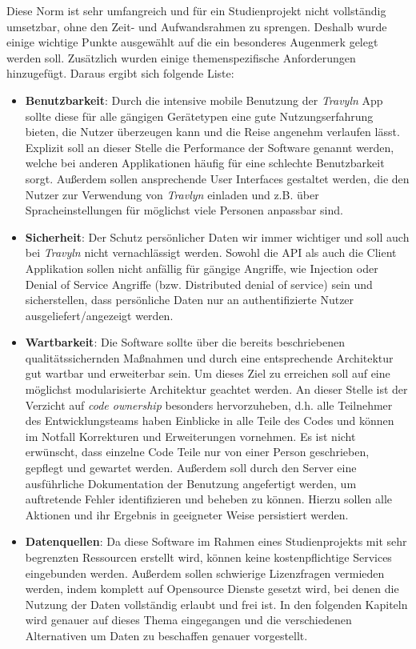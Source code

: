 Diese Norm ist sehr umfangreich und für ein Studienprojekt nicht vollständig umsetzbar, ohne den Zeit- und Aufwandsrahmen zu sprengen. Deshalb wurde einige wichtige Punkte ausgewählt auf die ein besonderes Augenmerk gelegt werden soll. Zusätzlich wurden einige themenspezifische Anforderungen hinzugefügt. Daraus ergibt sich folgende Liste:

\begin{itemize}
	\item \textbf{Benutzbarkeit}: Durch die intensive mobile Benutzung der \textit{Travyln} App sollte diese für alle gängigen Gerätetypen eine gute Nutzungserfahrung bieten, die Nutzer überzeugen kann und die Reise angenehm verlaufen lässt. Explizit soll an dieser Stelle die Performance der Software genannt werden, welche bei anderen Applikationen häufig für eine schlechte Benutzbarkeit sorgt. Außerdem sollen ansprechende User Interfaces gestaltet werden, die den Nutzer zur Verwendung von \textit{Travlyn} einladen und z.B. über Spracheinstellungen für möglichst viele Personen anpassbar sind.
	\item \textbf{Sicherheit}: Der Schutz persönlicher Daten wir immer wichtiger und soll auch bei \textit{Travyln} nicht vernachlässigt werden. Sowohl die API als auch die Client Applikation sollen nicht anfällig für gängige Angriffe, wie Injection oder Denial of Service Angriffe (bzw. Distributed denial of service) \cite{Mirkovic.2005} sein und sicherstellen, dass persönliche Daten nur an authentifizierte Nutzer ausgeliefert/angezeigt werden.
	\item \textbf{Wartbarkeit}: Die Software sollte über die bereits beschriebenen qualitätssichernden Maßnahmen und durch eine entsprechende Architektur gut wartbar und erweiterbar sein. Um dieses Ziel zu erreichen soll auf eine möglichst modularisierte Architektur geachtet werden. An dieser Stelle ist der Verzicht auf \textit{code ownership} besonders hervorzuheben, d.h. alle Teilnehmer des Entwicklungsteams haben Einblicke in alle Teile des Codes und können im Notfall Korrekturen und Erweiterungen vornehmen. Es ist nicht erwünscht, dass einzelne Code Teile nur von einer Person geschrieben, gepflegt und gewartet werden. Außerdem soll durch den Server eine ausführliche Dokumentation der Benutzung angefertigt werden, um auftretende Fehler identifizieren und beheben zu können. Hierzu sollen alle Aktionen und ihr Ergebnis in geeigneter Weise persistiert werden.
	\item \textbf{Datenquellen}: Da diese Software im Rahmen eines Studienprojekts mit sehr begrenzten Ressourcen erstellt wird, können keine kostenpflichtige Services eingebunden werden. Außerdem sollen schwierige Lizenzfragen vermieden werden, indem komplett auf Opensource Dienste gesetzt wird, bei denen die Nutzung der Daten vollständig erlaubt und frei ist. In den folgenden Kapiteln wird genauer auf dieses Thema eingegangen und die verschiedenen Alternativen um Daten zu beschaffen genauer vorgestellt.

\end{itemize}
